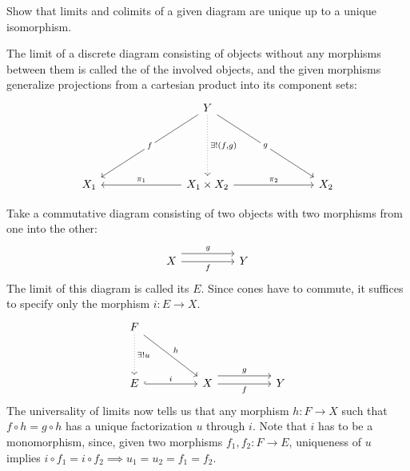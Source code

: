 \begin{exercise}
	Show that limits and colimits of a given diagram are unique up to a unique isomorphism.
\end{exercise}
\begin{definition}
	The limit of a discrete diagram consisting of objects without any morphisms between them is called the  of the involved objects, and the given morphisms generalize projections from a cartesian product into its component sets:
	\[\begin{tikzcd}
		&&& Y &&& \\
		\\
		\\
		{X_1} &&& {X_1 \times X_2} &&& {X_2}
		\arrow["f"{description}, from=1-4, to=4-1]
		\arrow["{\exists!(f,g)}", dotted, from=1-4, to=4-4]
		\arrow["g"{description}, from=1-4, to=4-7]
		\arrow["{\pi_1}"', from=4-4, to=4-1]
		\arrow["{\pi_2}", from=4-4, to=4-7]
	\end{tikzcd}\]
\end{definition}
\begin{definition}
	Take a commutative diagram consisting of two objects with two morphisms from one into the other:
	\[\begin{tikzcd}
		X && Y
		\arrow["f"', from=1-1, to=1-3]
		\arrow["g", shift left=3, from=1-1, to=1-3]
	\end{tikzcd}\]
	The limit of this diagram is called its  $E$. Since cones have to commute, it suffices to specify only the morphism $i : E \to X$.
	\[\begin{tikzcd}
		F &&&& \\
		\\
		E && X && Y
		\arrow["{\exists! u}", dotted, from=1-1, to=3-1]
		\arrow["h", from=1-1, to=3-3]
		\arrow["i", hook, from=3-1, to=3-3]
		\arrow["f"', from=3-3, to=3-5]
		\arrow["g", shift left=3, from=3-3, to=3-5]
	\end{tikzcd}\]
	The universality of limits now tells us that any morphism $h : F \to X$ such that $f \circ h = g \circ h$ has a unique factorization $u$ through $i$. Note that $i$ has to be a monomorphism, since, given two morphisms $f_1, f_2 : F \to E$, uniqueness of $u$ implies $i \circ f_1 = i \circ f_2 \implies u_1 = u_2 = f_1 = f_2$.
\end{definition}
